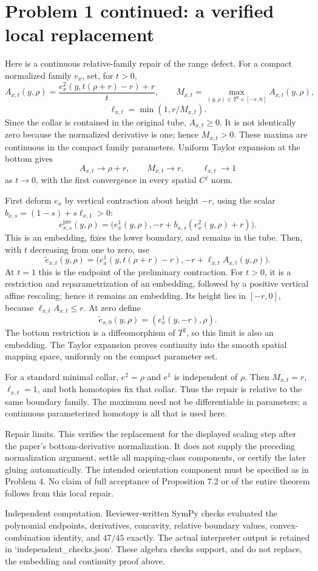 \documentclass[10pt]{article}
\begin{document}
\section*{Problem 1 continued: a verified local replacement}
Here is a continuous relative-family repair of the range defect. For a compact normalized family \(e_x\), set, for \(t>0\), \[A_{x,t}(y,\rho)=
 \frac{e_x^2(y,t(\rho+r)-r)+r}{t},\qquad
 M_{x,t}=\max_{(y,\rho)\in T^2\times[-r,0]}A_{x,t}(y,\rho),\] \[\ell_{x,t}=\min(1,r/M_{x,t}).\] Since the collar is contained in the original tube, \(A_{x,t}\ge0\). It is not identically zero because the normalized derivative is one; hence \(M_{x,t}>0\). These maxima are continuous in the compact family parameters. Uniform Taylor expansion at the bottom gives \[A_{x,t}\longrightarrow \rho+r,\qquad M_{x,t}\longrightarrow r,\qquad
 \ell_{x,t}\longrightarrow1\] as \(t\to0\), with the first convergence in every spatial \(C^j\) norm.\par
First deform \(e_x\) by vertical contraction about height \(-r\), using the scalar \(b_{x,s}=(1-s)+s\ell_{x,1}>0\): \[e^{\mathrm{pre}}_{x,s}(y,\rho)
 =\bigl(e_x^1(y,\rho),-r+b_{x,s}(e_x^2(y,\rho)+r)\bigr).\] This is an embedding, fixes the lower boundary, and remains in the tube. Then, with \(t\) decreasing from one to zero, use \[\widetilde e_{x,t}(y,\rho)=
 \bigl(e_x^1(y,t(\rho+r)-r),-r+\ell_{x,t}A_{x,t}(y,\rho)\bigr).\] At \(t=1\) this is the endpoint of the preliminary contraction. For \(t>0\), it is a restriction and reparametrization of an embedding, followed by a positive vertical affine rescaling; hence it remains an embedding. Its height lies in \([-r,0]\), because \(\ell_{x,t}A_{x,t}\le r\). At zero define \[\widetilde e_{x,0}(y,\rho)=(e_x^1(y,-r),\rho).\] The bottom restriction is a diffeomorphism of \(T^2\), so this limit is also an embedding. The Taylor expansion proves continuity into the smooth spatial mapping space, uniformly on the compact parameter set.\par
For a standard minimal collar, \(e^2=\rho\) and \(e^1\) is independent of \(\rho\). Then \(M_{x,t}=r\), \(\ell_{x,t}=1\), and both homotopies fix that collar. Thus the repair is relative to the same boundary family. The maximum need not be differentiable in parameters; a continuous parameterized homotopy is all that is used here.\par
Repair limits. This verifies the replacement for the displayed scaling step after the paper’s bottom-derivative normalization. It does not supply the preceding normalization argument, settle all mapping-class components, or certify the later gluing automatically. The intended orientation component must be specified as in Problem 4. No claim of full acceptance of Proposition 7.2 or of the entire theorem follows from this local repair.\par
Independent computation. Reviewer-written SymPy checks evaluated the polynomial endpoints, derivatives, concavity, relative boundary values, convex-combination identity, and \(47/45\) exactly. The actual interpreter output is retained in `independent\_checks.json`. These algebra checks support, and do not replace, the embedding and continuity proof above.\par
\end{document}
